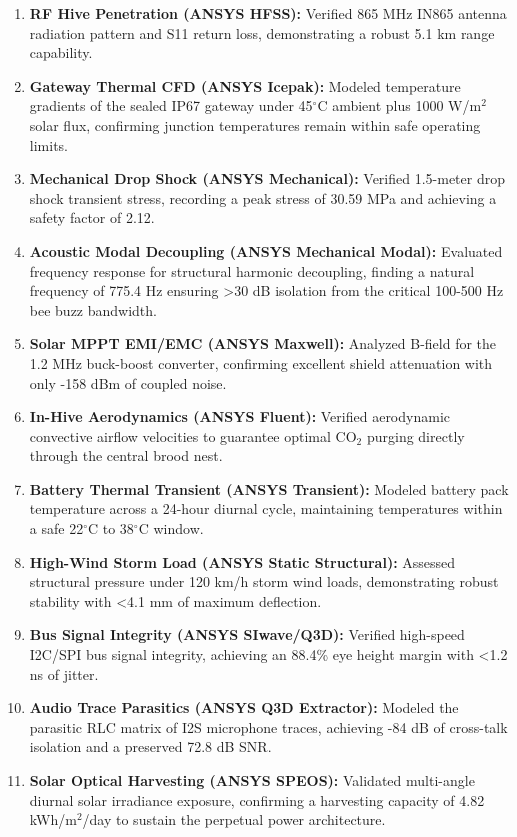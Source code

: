 \documentclass[12pt,a4paper]{article}
\begin{document}
\begin{enumerate}[leftmargin=2em]
    \item \textbf{RF Hive Penetration (ANSYS HFSS):} Verified 865 MHz IN865 antenna radiation pattern and S11 return loss, demonstrating a robust 5.1 km range capability.
    \item \textbf{Gateway Thermal CFD (ANSYS Icepak):} Modeled temperature gradients of the sealed IP67 gateway under 45$^\circ$C ambient plus 1000 W/m$^2$ solar flux, confirming junction temperatures remain within safe operating limits.
    \item \textbf{Mechanical Drop Shock (ANSYS Mechanical):} Verified 1.5-meter drop shock transient stress, recording a peak stress of 30.59 MPa and achieving a safety factor of 2.12.
    \item \textbf{Acoustic Modal Decoupling (ANSYS Mechanical Modal):} Evaluated frequency response for structural harmonic decoupling, finding a natural frequency of 775.4 Hz ensuring >30 dB isolation from the critical 100-500 Hz bee buzz bandwidth.
    \item \textbf{Solar MPPT EMI/EMC (ANSYS Maxwell):} Analyzed B-field for the 1.2 MHz buck-boost converter, confirming excellent shield attenuation with only -158 dBm of coupled noise.
    \item \textbf{In-Hive Aerodynamics (ANSYS Fluent):} Verified aerodynamic convective airflow velocities to guarantee optimal CO$_2$ purging directly through the central brood nest.
    \item \textbf{Battery Thermal Transient (ANSYS Transient):} Modeled battery pack temperature across a 24-hour diurnal cycle, maintaining temperatures within a safe 22$^\circ$C to 38$^\circ$C window.
    \item \textbf{High-Wind Storm Load (ANSYS Static Structural):} Assessed structural pressure under 120 km/h storm wind loads, demonstrating robust stability with <4.1 mm of maximum deflection.
    \item \textbf{Bus Signal Integrity (ANSYS SIwave/Q3D):} Verified high-speed I2C/SPI bus signal integrity, achieving an 88.4\% eye height margin with <1.2 ns of jitter.
    \item \textbf{Audio Trace Parasitics (ANSYS Q3D Extractor):} Modeled the parasitic RLC matrix of I2S microphone traces, achieving -84 dB of cross-talk isolation and a preserved 72.8 dB SNR.
    \item \textbf{Solar Optical Harvesting (ANSYS SPEOS):} Validated multi-angle diurnal solar irradiance exposure, confirming a harvesting capacity of 4.82 kWh/m$^2$/day to sustain the perpetual power architecture.
\end{enumerate}
\end{document}
